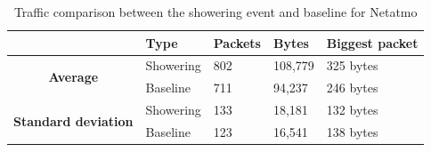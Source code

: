\begin{table}[H]
    \centering
    \caption{Traffic comparison between the showering event and baseline for Netatmo}
    \begin{tabular}{c|l|l|l|l|}
        \cline{2-5}
        \multicolumn{1}{l|}{}                                              & \textbf{Type} & \textbf{Packets} & \textbf{Bytes} & \textbf{Biggest packet} \\ \hline
        \multicolumn{1}{|c|}{\multirow{2}{*}{\textbf{Average}}}            & Showering         & 802              & 108,779        & 325 bytes               \\ \cline{2-5} 
        \multicolumn{1}{|c|}{}                                             & Baseline      & 711              & 94,237         & 246 bytes                \\ \hline
        \multicolumn{1}{|c|}{\multirow{2}{*}{\textbf{Standard deviation}}} & Showering         & 133              & 18,181         & 132 bytes                 \\ \cline{2-5} 
        \multicolumn{1}{|c|}{}                                             & Baseline      & 123              & 16,541         & 138 bytes               \\ \hline          
    \end{tabular}
    \label{tab:NetatmoComparingBaselineAndShowerCalculations}
\end{table}

